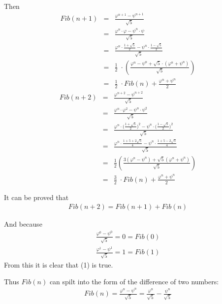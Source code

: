 \documentclass{article}
\begin{document}
	\noindent
	Then
	\begin{eqnarray}
		Fib(n + 1) &=& \frac{\varphi^{n+1} - \psi^{n+1}}{\sqrt{5}} \nonumber \\
                   &=& \frac{\varphi^{n}\cdot\varphi - \psi^{n}\cdot\psi}{\sqrt{5}} \nonumber \\
                   &=& \frac{\varphi^n\cdot{\displaystyle\frac{1+\sqrt5}2 - \psi^n}\cdot{\displaystyle
                       \frac{1 - \sqrt5}2}}{\sqrt5} \nonumber \\
				   &=& \frac12\;\cdot\left(\frac{\varphi^n - \psi^n +
						{\displaystyle\sqrt5\cdot\left(\varphi^n+\psi^n\right)}}{\sqrt5}\right) \nonumber \\
               	   &=& \frac12\;\cdot Fib(n)+\frac{\varphi^n+\psi^n}2
	\end{eqnarray}
	\begin{eqnarray}
		Fib(n + 2) &=& \frac{\varphi^{n+2} - \psi^{n+2}}{\sqrt{5}} \nonumber \\
                   &=& \frac{\varphi^{n}\cdot\varphi^2 - \psi^{n}\cdot\psi^2}{\sqrt{5}} \nonumber \\
                   &=& \frac{\varphi^n\cdot({\displaystyle\frac{1+\sqrt5}2)^2 - \psi^n}\cdot({\displaystyle
                       \frac{1 - \sqrt5}2)^2}}{\sqrt5} \nonumber \\
				   &=& \frac{\varphi^n\cdot{\displaystyle\frac{1+5+2\sqrt5}4}- 
						\psi^n\cdot{\displaystyle\frac{1+5-2\sqrt5}4}}{\sqrt5} \nonumber \\
				   &=& \frac12\left(\frac{3\left(\varphi^n-\psi^n\right)+
                        \sqrt5\left(\varphi^n+\psi^n\right)}{\sqrt5}\right) \nonumber \\
               	   &=& \frac32\;\cdot Fib(n)+\frac{\varphi^n+\psi^n}2
	\end{eqnarray}


	\noindent
	It can be proved that
	\begin{eqnarray}
		Fib(n+2)=Fib(n+1)+Fib(n)
	\end{eqnarray}


	\noindent
	And because
	\begin{eqnarray}
		\frac{\varphi^0-\psi^0}{\sqrt5}=0=Fib\left(0\right) \\
		\frac{\varphi^1-\psi^1}{\sqrt5}=1=Fib\left(1\right)
	\end{eqnarray}
	From this it is clear that (1) is true.


	\noindent
	Thus $Fib(n)$ can spilt into the form of the difference of two numbers:
	\begin{eqnarray}
		Fib\left(n\right)=\frac{\varphi^n-\psi^n}{\sqrt5}=\frac{\varphi^n}{\sqrt5}-\frac{\psi^n}{\sqrt5}
	\end{eqnarray}
\end{document}
